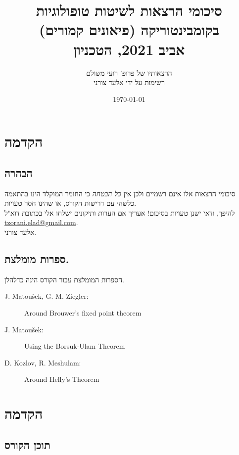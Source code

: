 \documentclass[a4paper,10pt,twoside,openany]{book}
\title{סיכומי הרצאות לשיטות טופולוגיות בקומבינטוריקה (פיאונים קמורים) \\ \large{אביב 2021, הטכניון}}
\author{הרצאותיו של פרופ' רועי משולם \\ \large רשימות על ידי אלעד צורני}
\date{\today}
\begin{document}
\frontmatter
{}
\tableofcontents
\countlectures
\newpage

\chapter*{הקדמה}
 

\section*{הבהרה}

סיכומי הרצאות אלו אינם רשמיים ולכן אין
\emph{כל הבטחה}
כי החומר המוקלד הינו בהתאמה כלשהי עם דרישות הקורס, או שהינו חסר טעויות.
\\
להיפך, ודאי ישנן טעויות בסיכום! אעריך אם הערות ותיקונים ישלחו אלי בכתובת דוא"ל
\textenglish{\href{mailto:tzorani.elad@gmail.com}{tzorani.elad@gmail.com}}.\\
אלעד צורני.

\section*{ספרות מומלצת.}

הספרות המומלצת עבור הקורס הינה כדלהלן.

\begin{english}
\begin{description}
\item[J. Matoušek, G. M. Ziegler:] Around Brouwer’s fixed point theorem

\item[J. Matoušek:] Using the Borsuk-Ulam Theorem

\item[D. Kozlov, R. Meshulam:] Around Helly's Theorem
\end{description}
\end{english}

\mainmatter

\chapter*{הקדמה}
\section{תוכן הקורס}
\end{document}
